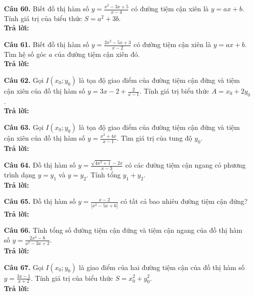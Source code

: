 \documentclass[12pt]{article}
\newcommand{\otraloi}{\underline{\hspace{5cm}}}
\begin{document}
	\vspace{0.6cm}
	\noindent \textbf{Câu 60.} Biết đồ thị hàm số $y = \frac{x^2 - 3x + 5}{x - 4}$ có đường tiệm cận xiên là $y = ax + b$. Tính giá trị của biểu thức $S = a^2 + 3b$.
	\\[4pt] \textbf{Trả lời:} \otraloi
	
	\vspace{0.6cm}
	\noindent \textbf{Câu 61.} Biết đồ thị hàm số $y = \frac{2x^2 - 5x + 3}{x - 2}$ có đường tiệm cận xiên là $y = ax + b$. Tìm hệ số góc $a$ của đường tiệm cận xiên đó.
	\\[4pt] \textbf{Trả lời:} \otraloi
	
	\vspace{0.6cm}
	\noindent \textbf{Câu 62.} Gọi $I(x_0; y_0)$ là tọa độ giao điểm của đường tiệm cận đứng và tiệm cận xiên của đồ thị hàm số $y = 3x - 2 + \frac{2}{x - 1}$. Tính giá trị biểu thức $A = x_0 + 2y_0$.
	\\[4pt] \textbf{Trả lời:} \otraloi
	
	\vspace{0.6cm}
	\noindent \textbf{Câu 63.} Gọi $I(x_0; y_0)$ là tọa độ giao điểm của đường tiệm cận đứng và tiệm cận xiên của đồ thị hàm số $y = \frac{x^2 + 4x}{x - 1}$. Tìm giá trị của tung độ $y_0$.
	\\[4pt] \textbf{Trả lời:} \otraloi
	
	\vspace{0.6cm}
	\noindent \textbf{Câu 64.} Đồ thị hàm số $y = \frac{\sqrt{4x^2 + 1} - 2x}{x - 3}$ có các đường tiệm cận ngang có phương trình dạng $y = y_1$ và $y = y_2$. Tính tổng $y_1 + y_2$.
	\\[4pt] \textbf{Trả lời:} \otraloi
	
	\vspace{0.6cm}
	\noindent \textbf{Câu 65.} Đồ thị hàm số $y = \frac{x - 2}{|x^2 - 5x + 6|}$ có tất cả bao nhiêu đường tiệm cận đứng?
	\\[4pt] \textbf{Trả lời:} \otraloi
	
	\vspace{0.6cm}
	\noindent \textbf{Câu 66.} Tính tổng số đường tiệm cận đứng và tiệm cận ngang của đồ thị hàm số $y = \frac{2x^2 - 8}{x^2 - 3x + 2}$.
	\\[4pt] \textbf{Trả lời:} \otraloi
	
	\vspace{0.6cm}
	\noindent \textbf{Câu 67.} Gọi $I(x_0; y_0)$ là giao điểm của hai đường tiệm cận của đồ thị hàm số $y = \frac{3x - 1}{x + 2}$. Tính giá trị của biểu thức $S = x_0^2 + y_0^2$.
	\\[4pt] \textbf{Trả lời:} \otraloi
	
\end{document}
